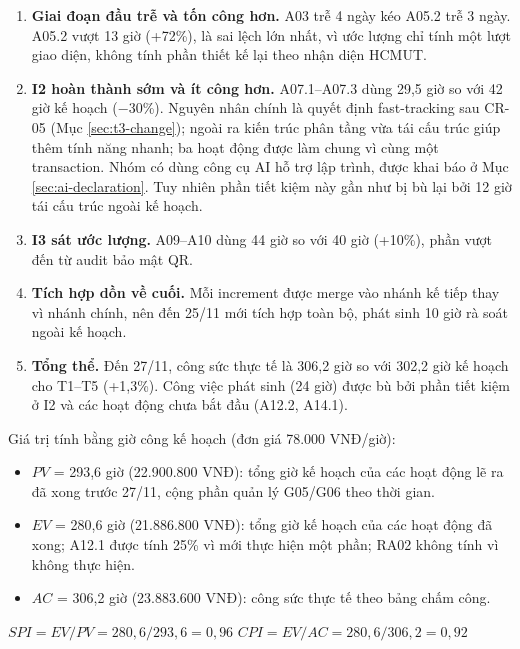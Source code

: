 
\begin{enumerate}
    \item \textbf{Giai đoạn đầu trễ và tốn công hơn.} A03 trễ 4 ngày kéo A05.2 trễ 3 ngày. A05.2 vượt 13 giờ (+72\%), là sai lệch lớn nhất, vì ước lượng chỉ tính một lượt giao diện, không tính phần thiết kế lại theo nhận diện HCMUT.
    \item \textbf{I2 hoàn thành sớm và ít công hơn.} A07.1--A07.3 dùng 29,5 giờ so với 42 giờ kế hoạch ($-$30\%). Nguyên nhân chính là quyết định fast-tracking sau CR-05 (Mục \ref{sec:t3-change}); ngoài ra kiến trúc phân tầng vừa tái cấu trúc giúp thêm tính năng nhanh; ba hoạt động được làm chung vì cùng một transaction. Nhóm có dùng công cụ AI hỗ trợ lập trình, được khai báo ở Mục \ref{sec:ai-declaration}. Tuy nhiên phần tiết kiệm này gần như bị bù lại bởi 12 giờ tái cấu trúc ngoài kế hoạch.
    \item \textbf{I3 sát ước lượng.} A09--A10 dùng 44 giờ so với 40 giờ (+10\%), phần vượt đến từ audit bảo mật QR.
    \item \textbf{Tích hợp dồn về cuối.} Mỗi increment được merge vào nhánh kế tiếp thay vì nhánh chính, nên đến 25/11 mới tích hợp toàn bộ, phát sinh 10 giờ rà soát ngoài kế hoạch.
    \item \textbf{Tổng thể.} Đến 27/11, công sức thực tế là 306,2 giờ so với 302,2 giờ kế hoạch cho T1--T5 (+1,3\%). Công việc phát sinh (24 giờ) được bù bởi phần tiết kiệm ở I2 và các hoạt động chưa bắt đầu (A12.2, A14.1).
\end{enumerate}


Giá trị tính bằng giờ công kế hoạch (đơn giá 78.000 VNĐ/giờ):
\begin{itemize}
    \item $PV$ = 293,6 giờ (22.900.800 VNĐ): tổng giờ kế hoạch của các hoạt động lẽ ra đã xong trước 27/11, cộng phần quản lý G05/G06 theo thời gian.
    \item $EV$ = 280,6 giờ (21.886.800 VNĐ): tổng giờ kế hoạch của các hoạt động đã xong; A12.1 được tính 25\% vì mới thực hiện một phần; RA02 không tính vì không thực hiện.
    \item $AC$ = 306,2 giờ (23.883.600 VNĐ): công sức thực tế theo bảng chấm công.
\end{itemize}

\begin{center}
$SPI = EV/PV = 280{,}6 / 293{,}6 = 0{,}96$ \qquad $CPI = EV/AC = 280{,}6 / 306{,}2 = 0{,}92$
\end{center}


